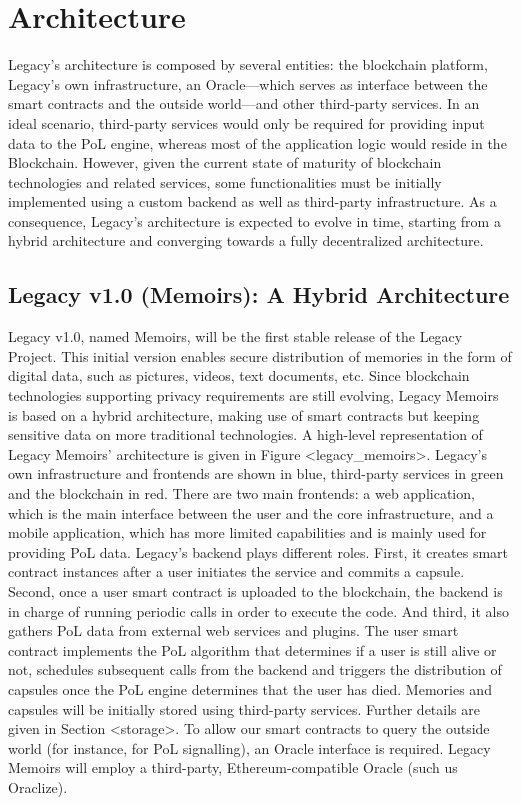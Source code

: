 
\section{Architecture} %
\label{sec:architecture}
Legacy’s architecture is composed by several entities: the blockchain platform, Legacy’s own infrastructure, an Oracle---which serves as interface between the smart contracts and the outside world---and other third-party services. In an ideal scenario, third-party services would only be required for providing input data to the PoL engine, whereas most of the application logic would reside in the Blockchain. However, given the current state of maturity of blockchain technologies and related services, some functionalities must be initially implemented using a custom backend as well as third-party infrastructure. As a consequence, Legacy’s architecture is expected to evolve in time, starting from a hybrid architecture and converging towards a fully decentralized architecture.

\subsection{Legacy v1.0 (Memoirs): A Hybrid Architecture} %
\label{sub:legacy_v1_0_memoirs_a_hybrid_architecture}
Legacy v1.0, named Memoirs, will be the first stable release of the Legacy Project. This initial version enables secure distribution of memories in the form of digital data, such as pictures, videos, text documents, etc. Since blockchain technologies supporting privacy requirements are still evolving, Legacy Memoirs is based on a hybrid architecture, making use of smart contracts but keeping sensitive data on more traditional technologies.
A high-level representation of Legacy Memoirs’ architecture is given in Figure <legacy_memoirs>. Legacy’s own infrastructure and frontends are shown in blue, third-party services in green and the blockchain in red. There are two main frontends: a web application, which is the main interface between the user and the core infrastructure, and a mobile application, which has more limited capabilities and is mainly used for providing PoL data. Legacy’s backend plays different roles. First, it creates smart contract instances after a user initiates the service and commits a capsule. Second, once a user smart contract is uploaded to the blockchain, the backend is in charge of running periodic calls in order to execute the code. And third, it also gathers PoL data from external web services and plugins. The user smart contract implements the PoL algorithm that determines if a user is still alive or not, schedules subsequent calls from the backend and triggers the distribution of capsules once the PoL engine determines that the user has died. 
Memories and capsules will be initially stored using third-party services. Further details are given in Section <storage>.
To allow our smart contracts to query the outside world (for instance, for PoL signalling), an Oracle interface is required. Legacy Memoirs will employ a third-party, Ethereum-compatible Oracle (such us Oraclize).

